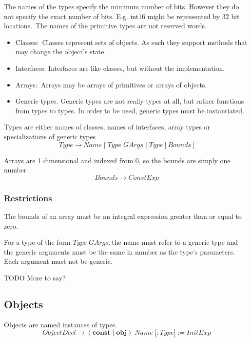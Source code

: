 \documentclass{article}%
\begin{document}
The names of the types specify the minimum number of bits. However they do not
specify the exact number of bits. E.g. int16 might be represented by 32 bit
locations.\ The names of the primitive types are not reserved words.

\begin{itemize}
\item Classes:\ Classes represent sets of objects. As such they support
methods that may change the object's state.

\item Interfaces. Interfaces are like classes, but without the implementation.

\item Arrays:\ Arrays may be arrays of primitives or arrays of objects.

\item Generic types. Generic types are not really types at all, but rather
functions from types to types. In order to be used, generic types must be instantiated.
\end{itemize}

Types are either names of classes, names of interfaces, array types or
specializations of generic types%
\[
\mathit{Type}\rightarrow\mathit{Name}\mid\mathit{Type}\;\mathit{GArgs}%
\mid\mathit{Type\ }\mathbf{[\ }\mathit{Bounds}\ \mathbf{]}%
\]


Arrays are 1 dimensional and indexed from $0$, so the bounds are simply one
number%
\[
\mathit{Bounds}\rightarrow\mathit{ConstExp}%
\]


\subsubsection{Restrictions}

The bounds of an array must be an integral expression greater than or equal to zero.

For a type of the form $\mathit{Type}\;\mathit{GArgs},$the name must refer to
a generic type and the generic arguments must be the same in number as the
type's parameters. Each argument must not be generic.

TODO More to say?

\subsection{Objects}

Objects are named instances of types.%
\[
\mathit{ObjectDecl}\rightarrow(\mathbf{const}\mid\mathbf{obj})\;\mathit{Name}%
\;\underline{[}:\mathit{Type}\underline{]}:=\mathit{InitExp}%
\]
\end{document}
